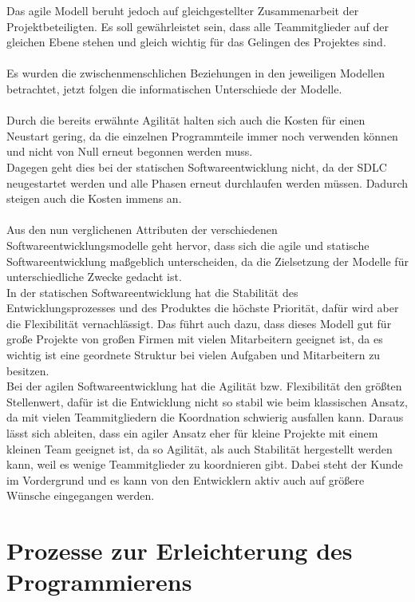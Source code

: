 \documentclass[a4paper, 10pt]{scrartcl}
\begin{document}
Das agile Modell beruht jedoch auf gleichgestellter Zusammenarbeit der Projektbeteiligten. Es soll gewährleistet sein, dass alle Teammitglieder auf der gleichen Ebene stehen und gleich wichtig für das Gelingen des Projektes sind.\\\\
Es wurden die zwischenmenschlichen Beziehungen in den jeweiligen Modellen betrachtet, jetzt folgen die informatischen Unterschiede der Modelle.\\\\
Durch die bereits erwähnte Agilität halten sich auch die Kosten für einen Neustart gering, da die einzelnen Programmteile immer noch verwenden können und nicht \glqq von Null\grqq{} erneut begonnen werden muss.\\
Dagegen geht dies bei der statischen Softwareentwicklung nicht, da der SDLC neugestartet werden und alle Phasen erneut durchlaufen werden müssen. Dadurch steigen auch die Kosten immens an.\\\\
Aus den nun verglichenen Attributen der verschiedenen Softwareentwicklungsmodelle geht hervor, dass sich die agile und statische Softwareentwicklung maßgeblich unterscheiden, da die Zielsetzung der Modelle für unterschiedliche Zwecke gedacht ist.\\
In der statischen Softwareentwicklung hat die Stabilität des Entwicklungsprozesses und des Produktes die höchste Priorität, dafür wird aber die Flexibilität vernachlässigt. Das führt auch dazu, dass dieses Modell gut für große Projekte von großen Firmen mit vielen Mitarbeitern geeignet ist, da es wichtig ist eine geordnete Struktur bei vielen Aufgaben und Mitarbeitern zu besitzen.\\
Bei der agilen Softwareentwicklung hat die Agilität bzw. Flexibilität den größten Stellenwert, dafür ist die Entwicklung nicht so stabil wie beim klassischen Ansatz, da mit vielen Teammitgliedern die Koordnation schwierig ausfallen kann. Daraus lässt sich ableiten, dass ein agiler Ansatz eher für kleine Projekte mit einem kleinen Team geeignet ist, da so Agilität, als auch Stabilität hergestellt werden kann, weil es wenige Teammitglieder zu koordnieren gibt. Dabei steht der Kunde im Vordergrund und es kann von den Entwicklern aktiv auch auf größere Wünsche eingegangen werden.

\section{Prozesse zur Erleichterung des Programmierens} \label{Erleichterung}
\end{document}
